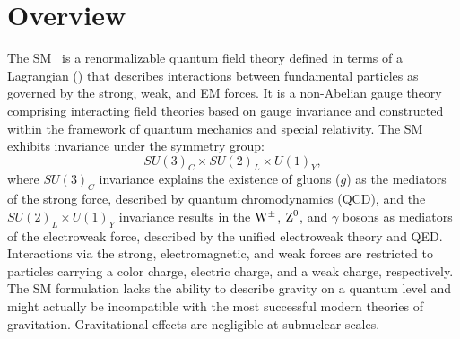 
\section{Overview}
\label{sec:sm_overview}

The SM~\cite{Glashow:1961tr,PhysRevLett.19.1264} is a renormalizable quantum field theory defined in terms of a Lagrangian (\lagrang) that describes interactions between fundamental particles as governed by the strong, weak, and EM forces.
It is a non-Abelian gauge theory comprising interacting field theories based on gauge invariance and constructed within the framework of quantum mechanics and special relativity.
The SM exhibits invariance under the symmetry group:
\begin{equation}
    SU(3)_C \times SU(2)_L \times U(1)_Y,
\end{equation}
where $SU(3)_C$ invariance explains the existence of gluons ($g$) as the mediators of the strong force, described by quantum chromodynamics (QCD), and the $SU(2)_L \times U(1)_Y$ invariance results in the $\mathrm{W}^\pm$, $\text{Z}^0$, and $\gamma$ bosons as mediators of the electroweak force, described by the unified electroweak theory and QED.
Interactions via the strong, electromagnetic, and weak forces are restricted to particles carrying a color charge, electric charge, and a weak charge, respectively.
The SM formulation lacks the ability to describe gravity on a quantum level and might actually be incompatible with the most successful modern theories of gravitation.
Gravitational effects are negligible at subnuclear scales.



